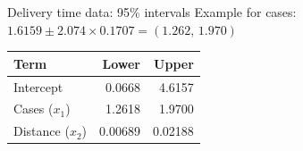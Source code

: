 \begin{frame}{Delivery time data: 95\% intervals}
    Example for cases: $1.6159 \pm 2.074 \times 0.1707 = (1.262,\, 1.970)$
    \begin{center}
        \begin{tabular}{lrr}
            \toprule
            Term & Lower & Upper \\
            \midrule
            Intercept & 0.0668 & 4.6157 \\
            Cases ($x_1$) & 1.2618 & 1.9700 \\
            Distance ($x_2$) & 0.00689 & 0.02188 \\
            \bottomrule
        \end{tabular}
    \end{center}
\end{frame}






